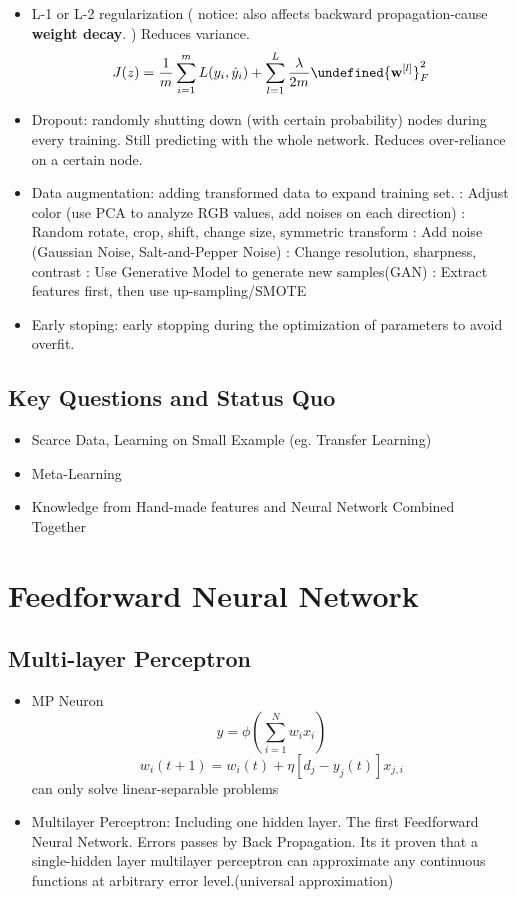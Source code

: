 \documentclass[11pt, openany]{book}              %
\let\norm\undefined %
\DeclarePairedDelimiter\norm{\lVert}{\rVert}
\begin{document}
\begin{itemize}
    \item L-1 or L-2 regularization ( notice: also affects backward propagation-cause 
\textbf{weight decay}. ) Reduces variance.
	$$J(z) = \frac{1}{m} \sum_{i=1}^m L(y_i,\hat{y}_i) + \sum_{l=1}^L\frac{\lambda}{2m}\norm{\mathbf{w}^{[l]}}^2_F$$
   \item Dropout: randomly shutting down (with certain probability) nodes during every training. Still predicting with the whole network. Reduces over-reliance on a certain node.
  \item Data augmentation: adding transformed data to expand training set. 
  		\subitem: Adjust color (use PCA to analyze RGB values, add noises on each direction)
  		\subitem: Random rotate, crop, shift, change size, symmetric transform
  		\subitem: Add noise (Gaussian Noise, Salt-and-Pepper Noise)
  		\subitem: Change resolution, sharpness, contrast
  		\subitem: Use Generative Model to generate new samples(GAN)
  		\subitem: Extract features first, then use up-sampling/SMOTE
 \item Early stoping: early stopping during the optimization of parameters to avoid overfit.
\end{itemize}

\section{Key Questions and Status Quo}

\begin{itemize}
	\item Scarce Data, Learning on Small Example (eg. Transfer Learning)
	\item Meta-Learning
	\item Knowledge from Hand-made features and Neural Network Combined Together 
\end{itemize}


\chapter{Feedforward Neural Network}
\section{Multi-layer Perceptron}

\begin{itemize}
    \item MP Neuron $$y = \phi(\sum_{i=1}^N w_ix_i)$$ $$w_i(t+1) = w_i(t) + \eta [d_j-y_j(t)]x_{j,i}$$ can only solve linear-separable problems
    \item Multilayer Perceptron: Including one hidden layer. The first Feedforward Neural Network. Errors passes by Back Propagation. Its it proven that a single-hidden layer multilayer perceptron can approximate any continuous functions at arbitrary error level.(universal approximation)
\end{itemize}
\end{document}
